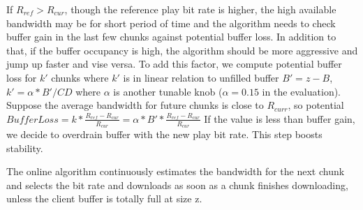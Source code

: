 If $R_{ref} >R_{cur} $, though the reference play bit rate is higher,
the high available bandwidth may be for short period of time and the
algorithm needs to check buffer gain in the last few chunks against
potential buffer loss. 
In addition to that, if the buffer occupancy is
high, the algorithm should be more aggressive and jump up faster and
vise versa. To add this factor, we compute potential buffer loss for
$k'$ chunks where $k'$ is in linear relation to unfilled buffer
$B'=z-B$, $k'=\alpha * B'/CD$ where $\alpha$ is another tunable knob ($\alpha=0.15$ in the evaluation). 
Suppose the average bandwidth for future chunks is close to $R_{curr}$,
so potential $BufferLoss= k* \frac{R_{ref}-R_{cur}}{R_{cur}}= \alpha *
B' *\frac{R_{ref}-R_{cur}}{R_{cur}}  $
If the value is less than buffer
gain, we decide to overdrain buffer with the new play bit rate. This
step boosts stability.


The online algorithm continuously estimates the bandwidth for the next
chunk and selects the bit rate and downloads as soon as a chunk finishes downloading, unless the client
buffer is totally full at size z.





